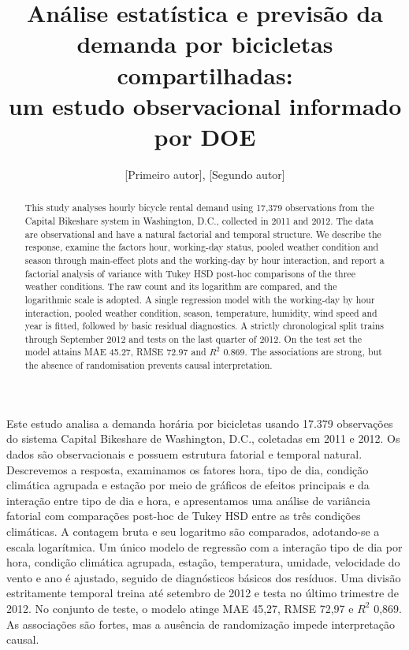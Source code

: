 \documentclass[12pt]{article}
\title{Análise estatística e previsão da demanda por bicicletas compartilhadas:\\
um estudo observacional informado por DOE}
\author{[Primeiro autor]\inst{1}, [Segundo autor]\inst{1}}
\begin{document}
\maketitle

\begin{abstract}
This study analyses hourly bicycle rental demand using 17,379 observations from
the Capital Bikeshare system in Washington, D.C., collected in 2011 and 2012.
The data are observational and have a natural factorial and temporal structure.
We describe the response, examine the factors hour, working-day status, pooled
weather condition and season through main-effect plots and the working-day by
hour interaction, and report a factorial analysis of variance with Tukey HSD
post-hoc comparisons of the three weather conditions. The raw count and its
logarithm are compared, and the logarithmic scale is adopted. A single
regression model with the working-day by hour interaction, pooled weather
condition, season, temperature, humidity, wind speed and year is fitted,
followed by basic residual diagnostics. A strictly chronological split trains through September
2012 and tests on the last quarter of 2012. On the test set the model attains
MAE 45.27, RMSE 72.97 and $R^2$ 0.869. The associations are strong, but the
absence of randomisation prevents causal interpretation.
\end{abstract}

\begin{resumo}
Este estudo analisa a demanda horária por bicicletas usando 17.379 observações
do sistema Capital Bikeshare de Washington, D.C., coletadas em 2011 e 2012. Os
dados são observacionais e possuem estrutura fatorial e temporal natural.
Descrevemos a resposta, examinamos os fatores hora, tipo de dia, condição
climática agrupada e estação por meio de gráficos de efeitos principais e da
interação entre tipo de dia e hora, e apresentamos uma análise de variância
fatorial com comparações post-hoc de Tukey HSD entre as três condições
climáticas. A contagem bruta e seu logaritmo são comparados, adotando-se a
escala logarítmica. Um único modelo de regressão com a interação tipo de dia
por hora, condição climática agrupada, estação, temperatura, umidade,
velocidade do vento e ano é ajustado,
seguido de diagnósticos básicos dos resíduos. Uma divisão estritamente temporal
treina até setembro de 2012 e testa no último trimestre de 2012. No conjunto de
teste, o modelo atinge MAE 45,27, RMSE 72,97 e $R^2$ 0,869. As associações são
fortes, mas a ausência de randomização impede interpretação causal.
\end{resumo}
\end{document}
